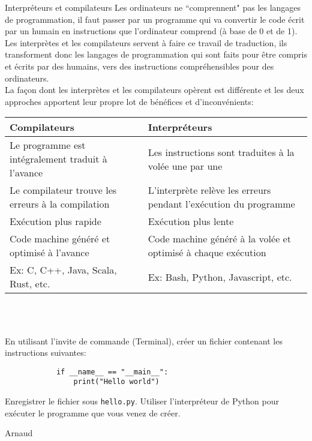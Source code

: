 \begin{section}{Interpréteurs et compilateurs}
    Les ordinateurs ne ``comprennent" pas les langages de programmation, il faut passer par un programme qui va convertir le code écrit par un humain en instructions que l'ordinateur comprend (à base de 0 et de 1).
\\
Les interprètes et les compilateurs servent à faire ce travail de traduction, ils transforment donc les langages de programmation qui sont faits pour être compris et écrits par des humains, vers des instructions compréhensibles pour des ordinateurs.
\\
La façon dont les interprètes et les compilateurs opèrent est différente et les deux approches apportent leur propre lot de bénéfices et d'inconvénients:\\
    \begin{tabular}{| C{0.45\textwidth} | C{0.45\textwidth} |} 
        \hline
        \textbf{Compilateurs} & \textbf{Interpréteurs}\\ [0.5ex]
        \hline
        Le programme est intégralement traduit à l'avance & Les instructions sont traduites à la volée une par une  \\
        \hline
        Le compilateur trouve les erreurs à la compilation & L'interprète relève les erreurs pendant l'exécution du programme  \\
        \hline
        Exécution plus rapide & Exécution plus lente \\
        \hline
        Code machine généré et optimisé à l'avance & Code machine généré à la volée et optimisé à chaque exécution  \\
        \hline
        Ex: C, C++, Java, Scala, Rust, etc. & Ex: Bash, Python, Javascript, etc. \\
        \hline
    \end{tabular}
    \\\\
    \begin{Exercice}[10 minutes]
        En utilisant l'invite de commande (Terminal), créer un fichier contenant les instructions suivantes:
        \begin{lstlisting}
            if __name__ == "__main__":
                print("Hello world")\end{lstlisting}
        Enregistrer le fichier sous \lstinline{hello.py}. Utiliser l'interpréteur de Python pour exécuter le programme que vous venez de créer.
    \end{Exercice}
    \begin{note}{Arnaud}

\end{note}
\end{section}
